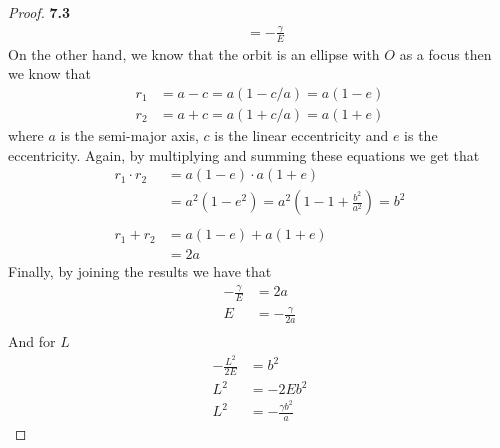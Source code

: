 \documentclass[11pt]{article}
\theoremstyle{definition}
\begin{document}
\begin{proof}{\textbf{7.3}}
\begin{align*}
                &= - \frac{\gamma}{E}
        \end{align*}
        On the other hand, we know that the orbit is an ellipse with $O$ as a focus then
        we know that
        \begin{align*}
            r_1 &= a - c = a(1 - c/a) = a(1 - e)\\
            r_2 &= a + c = a(1 + c/a) = a(1 + e)
        \end{align*}
        where $a$ is the semi-major axis, $c$ is the linear eccentricity and $e$ is the
        eccentricity.
        Again, by multiplying and summing these equations we get that
        \begin{align*}
            r_1 \cdot r_2 &= a(1 - e) \cdot a(1 + e)\\
                &= a^2(1 - e^2) = a^2(1 - 1 + \frac{b^2}{a^2}) = b^2\\\\
            r_1 + r_2 &= a(1 - e) + a(1 + e)\\
                &= 2a
        \end{align*}
        Finally, by joining the results we have that
        \begin{align*}
            -\frac{\gamma}{E} &= 2a\\
            E &= -\frac{\gamma}{2a}\\
        \end{align*}
        And for $L$
        \begin{align*}
            - \frac{L^2}{2E} &= b^2\\
            L^2 &= -2Eb^2\\
            L^2 &= -\frac{\gamma b^2}{a}
        \end{align*}

    \end{proof}
\cleardoublepage
\end{document}
